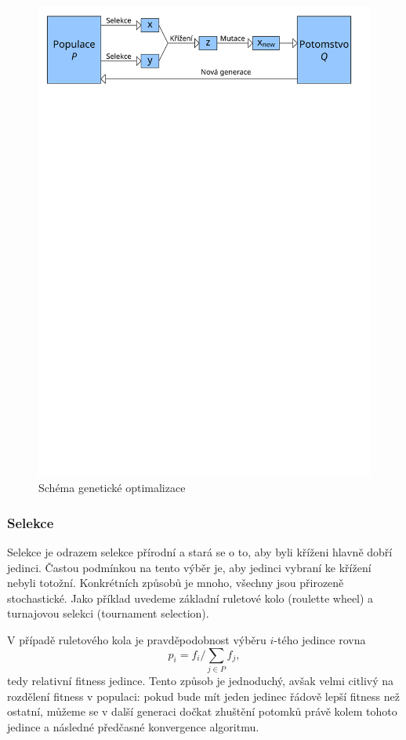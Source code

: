 \begin{figure}[h!]
  \includegraphics[width=\textwidth]{img/EA}
  \caption{Schéma genetické optimalizace}\label{EA fig}
\end{figure}

\subsubsection{Selekce}

Selekce je odrazem selekce přírodní a stará se o to, aby byli kříženi hlavně dobří jedinci. Častou podmínkou na tento výběr je, aby jedinci vybraní ke křížení nebyli totožní. Konkrétních způsobů je mnoho, všechny jsou přirozeně stochastické. Jako příklad uvedeme základní ruletové kolo (roulette wheel) a turnajovou selekci (tournament selection).

V případě ruletového kola je pravděpodobnost výběru $i$-tého jedince rovna 
\[
p_i = f_i/\sum_{j \in P} f_j,
\]
tedy relativní fitness jedince. Tento způsob je jednoduchý, avšak velmi citlivý na rozdělení fitness v populaci: pokud bude mít jeden jedinec řádově lepší fitness než ostatní, můžeme se v další generaci dočkat zhuštění potomků právě kolem tohoto jedince a následné předčasné konvergence algoritmu.

